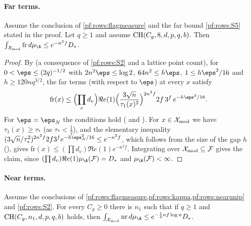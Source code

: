 \paragraph{Far terms.}

\begin{lemma}\label{pf:rows:far}
Assume the conclusion of \cref{pf:rows:flagmeasure} and the far bound \ref{pf:rows:S5} stated in the proof. Let $q\ge1$ and
assume $\mathrm{CH}(C_g,8,d,p,q,b)$. Then $\int_{\rowsmod}\mathrm{fr}\,d\mu_{\A}\le e^{-n^2f}\rowsDst$.
\end{lemma}

\begin{proof}
By  (a consequence of \ref{pf:rows:S2} and a lattice point count),
for $0<\eps\le(2q)^{-1/2}$ with $2n^2\eps\le\log2$, $64n^2\le h\eps$, $1\le h\eps^2/16$ and $h\ge120nq^{3/2}$, the far terms
(with respect to $\eps$) at every $x$ satisfy
\[
\mathrm{fr}(x)\le\Bigl(\prod_vd_v\Bigr)\Re e(1)\Bigl(\frac{3\sqrt n}{\tau_1(x)^2}\Bigr)^{2n^2f}2f\,3^f\,e^{-h\eps^2/16}.
\]
For $\eps=\eps_N$ the conditions hold ( and ).
For $x\in\mathcal{X}_{\mathrm{mod}}$ we have $\tau_1(x)\ge\tau_*$ (as $\tau_*<\frac12$), and the elementary inequality
$(3\sqrt n/\tau_*^2)^{2n^2f}2f3^fe^{-h\eps_N^2/16}\le e^{-n^2f}$, which follows from the size of the gap $h$
(), gives $\mathrm{fr}(x)\le(\prod d_v)\Re e(1)e^{-n^2f}$. Integrating over
$\mathcal{X}_{\mathrm{mod}}\subseteq\mathcal F$ gives the claim, since $(\prod d_v)\Re e(1)\mu_{\A}(\mathcal F)=\rowsDst$ and $\mu_{\A}(\mathcal F)<\infty$.
\end{proof}

\paragraph{Near terms.}

\begin{lemma}\label{pf:rows:near}
Assume the conclusions of \cref{pf:rows:flagmeasure,pf:rows:kappa,pf:rows:nearunip} and \ref{pf:rows:S2}. For every
$C_g\ge0$ there is $n_1$ such that if $q\ge1$ and $\mathrm{CH}(C_g,n_1,d,p,q,b)$ holds, then
$\int_{\rowsmod}\mathrm{nr}\,d\mu_{\A}\le e^{-\frac14nf\log n}\rowsDst$.
\end{lemma}

